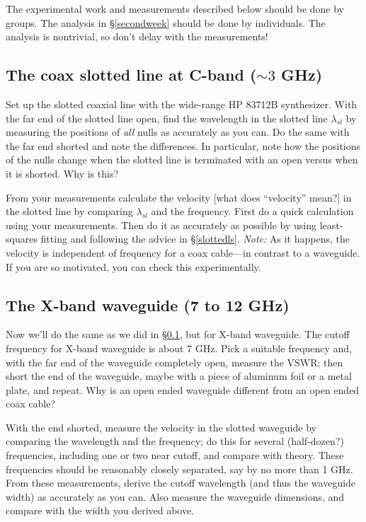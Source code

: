 \documentclass[11pt,preprint]{aastex}
\begin{document}
The experimental work and measurements described below should
be done by groups.  The analysis in \S \ref{secondweek} should be done
by individuals. The analysis is nontrivial, so don't delay with the
measurements!

{\boldmath %
\subsection {The coax slotted line at C-band ($\sim 3$ GHz)} \label{slotted}
} Set up the slotted coaxial line with the wide-range HP 83712B
synthesizer.  With the far end of the slotted line open, find the
wavelength in the slotted line $\lambda_{sl}$ by measuring the positions
of {\it all} nulls as accurately as you can.  Do the same with the far
end shorted and note the differences.  In particular, note how the
positions of the nulls change when the slotted line is terminated with
an open versus when it is shorted.  Why is this?

From your measurements calculate the velocity [what does ``velocity''
  mean?] in the slotted line by comparing $\lambda_{sl}$ and the
frequency.  First do a quick calculation using your measurements. Then
do it as accurately as possible by using least-squares fitting and
following the advice in \S \ref{slottedls}.  {\it Note:} As it happens,
the velocity is independent of frequency for a coax cable---in contrast
to a waveguide.  If you are so motivated, you can check this
experimentally.

\subsection {The X-band waveguide (7 to 12 GHz)} \label{waveguide}

Now we'll do the same as we did in \S \ref{slotted}, but for X-band
waveguide.  The cutoff frequency for X-band waveguide is about 7
GHz. Pick a suitable frequency and, with the far end of the waveguide
completely open, measure the VSWR; then short the end of the waveguide,
maybe with a piece of aluminum foil or a metal plate, and repeat.  Why
is an open ended waveguide different from an open ended coax cable?

With the end shorted, measure the velocity in the slotted waveguide by
comparing the wavelength and the frequency; do this for several
(half-dozen?) frequencies, including one or two near cutoff, and compare
with theory.  These frequencies should be reasonably closely separated,
say by no more than 1 GHz.  From these measurements, derive the cutoff
wavelength (and thus the waveguide width) as accurately as you can.
Also measure the waveguide dimensions, and compare 
with the width you derived above.
\end{document}
